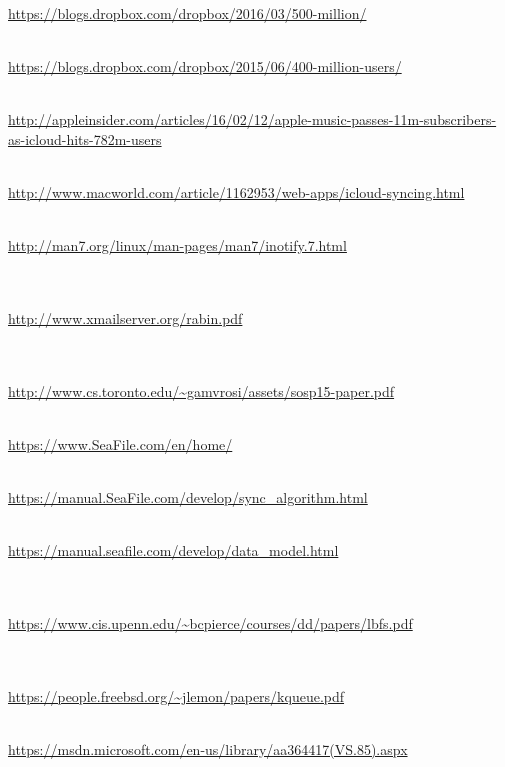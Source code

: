 \documentclass[table]{article}
\begin{document}
\begin{thebibliography}{9}

\\
\url{https://blogs.dropbox.com/dropbox/2016/03/500-million/}

\\
\url{https://blogs.dropbox.com/dropbox/2015/06/400-million-users/}

\\
\url{http://appleinsider.com/articles/16/02/12/apple-music-passes-11m-subscribers-as-icloud-hits-782m-users}

\\
\url{http://www.macworld.com/article/1162953/web-apps/icloud-syncing.html}

\\
\url{http://man7.org/linux/man-pages/man7/inotify.7.html}

\\
\\
\url{http://www.xmailserver.org/rabin.pdf}

\\
\\ \url{http://www.cs.toronto.edu/~gamvrosi/assets/sosp15-paper.pdf}

\\
\url{https://www.SeaFile.com/en/home/}

\\
\url{https://manual.SeaFile.com/develop/sync_algorithm.html}

\\
\url{https://manual.seafile.com/develop/data_model.html}

\\
\\ \url{https://www.cis.upenn.edu/~bcpierce/courses/dd/papers/lbfs.pdf}

\\
\\
\url{https://people.freebsd.org/~jlemon/papers/kqueue.pdf}

\\ \url{https://msdn.microsoft.com/en-us/library/aa364417(VS.85).aspx}

\end{thebibliography}
\end{document}
